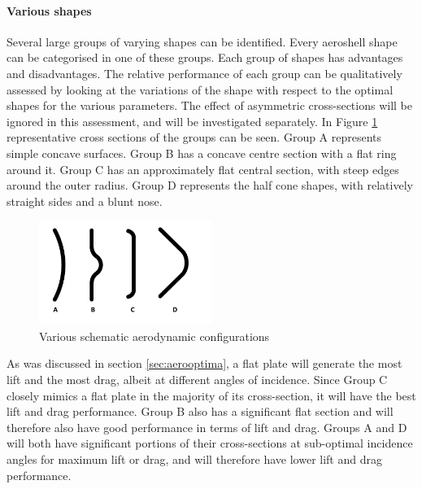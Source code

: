 \paragraph{Various shapes} \label{sec:aeroshapes}
Several large groups of varying shapes can be identified. Every aeroshell shape can be categorised in one of these groups.  Each group of shapes has advantages and disadvantages. The relative performance of each group can be qualitatively assessed by looking at the variations of the shape with respect to the optimal shapes for the various parameters. The effect of asymmetric cross-sections will be ignored in this assessment, and will be investigated separately. In Figure \ref{fig:aeroshapes} representative cross sections of the groups can be seen. Group A represents simple concave surfaces. Group B has a concave centre section with a flat ring around it. Group C has an approximately flat central section, with steep edges around the outer radius. Group D represents the half cone shapes, with relatively straight sides and a blunt nose. 

\begin{figure}[h]
	\centering
	\includegraphics[width=0.5\textwidth]{./Figure/Aerodynamics/AeroShapes.pdf}
	\caption{Various schematic aerodynamic configurations}
	\label{fig:aeroshapes}
\end{figure}

As was discussed in section \ref{sec:aerooptima}, a flat plate will generate the most lift and the most drag, albeit at different angles of incidence. Since Group C closely mimics a flat plate in the majority of its cross-section, it will have the best lift and drag performance. Group B also has a significant flat section and will therefore also have good performance in terms of lift and drag. Groups A and D will both have significant portions of their cross-sections at sub-optimal incidence angles for maximum lift or drag, and will therefore have lower lift and drag performance.

